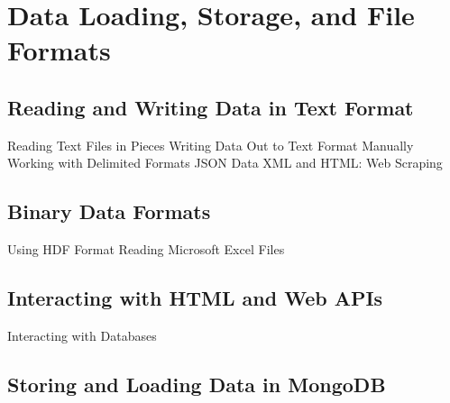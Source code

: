 

\section{Data Loading, Storage, and File Formats}
\subsection{Reading and Writing Data in Text Format}
Reading Text Files in Pieces
Writing Data Out to Text Format
Manually Working with Delimited Formats
JSON Data
XML and HTML: Web Scraping
\subsection{Binary Data Formats}
Using HDF Format
Reading Microsoft Excel Files
\subsection{Interacting with HTML and Web APIs}
Interacting with Databases
\subsection{Storing and Loading Data in MongoDB}
